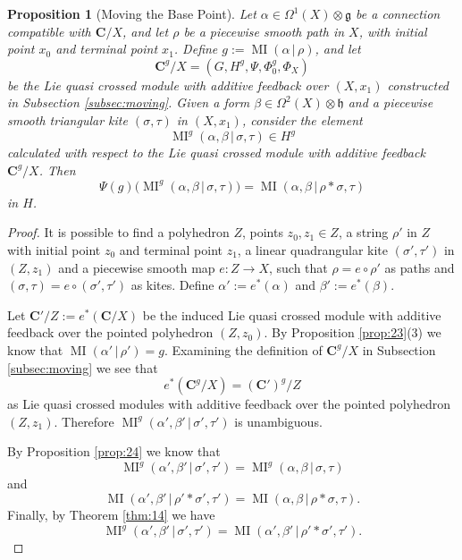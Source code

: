 \documentclass[10pt, a4paper]{amsart}
\newtheorem{prop}[equation]{Proposition}
\theoremstyle{definition}
\numberwithin{equation}{section}
\newcommand{\opn}{\operatorname}
\newcommand{\mfrak}[1]{\mathfrak{#1}}
\newcommand{\mbf}[1]{\mathbf{#1}}
\newcommand{\tup}[1]{\textup{#1}}
\renewcommand{\vert}{\, | \,}
\newcommand{\g}{\mfrak{g}}
\newcommand{\h}{\mfrak{h}}
\begin{document}
\begin{prop}[Moving the Base Point] \label{prop:25}
Let $\alpha \in \Omega^1(X) \otimes \g$
be a connection compatible with $\mbf{C} / X$, and let
$\rho$ be a piecewise smooth path in $X$, with initial point $x_0$ and terminal
point $x_1$. Define
$g := \opn{MI}(\alpha \vert \rho)$, 
and let
\[ \mbf{C}^g / X = (G, H^g, \Psi, \Phi_0^g, \Phi_X) \]
be the Lie quasi crossed module with additive feedback over $(X, x_1)$
constructed in Subsection \tup{\ref{subsec:moving}}.
Given a form 
$\beta \in \Omega^2(X) \otimes \h$ and a piecewise smooth triangular kite
$(\sigma, \tau)$ in  $(X, x_1)$, consider the element
\[ \opn{MI}^g(\alpha, \beta \vert \sigma, \tau) \in H^g  \]
calculated with respect to the Lie quasi crossed module
with additive feedback $\mbf{C}^g / X$. Then 
\[ \Psi(g) \bigl( \opn{MI}^g(\alpha, \beta \vert \sigma, \tau) \bigr)  =
\opn{MI}(\alpha, \beta \vert \rho * \sigma, \tau)  \]
in $H$. 
\end{prop}

\begin{proof}
It is possible to find a polyhedron $Z$, points  $z_0, z_1 \in Z$, a string
$\rho'$ in $Z$ with initial point $z_0$ and terminal point $z_1$, 
a linear quadrangular kite $(\sigma', \tau')$ in 
$(Z, z_1)$ and a piecewise smooth map 
$e : Z \to X$, such that $\rho = e \circ \rho'$ as paths and 
$(\sigma, \tau) = e \circ (\sigma', \tau')$ as kites. 
Define
$\alpha' := e^*(\alpha)$ and $\beta' := e^*(\beta)$.

Let $\mbf{C}' / Z := e^*(\mbf{C} / X)$ be the induced 
Lie quasi crossed module with additive feedback over the pointed polyhedron
$(Z, z_0)$. By Proposition \ref{prop:23}(3) we know that 
$\opn{MI}(\alpha' \vert \rho') = g$. Examining the definition of
$\mbf{C}^g / X$ in Subsection \ref{subsec:moving} we see that
\[ e^*(\mbf{C}^g / X) = (\mbf{C}')^g / Z \]
as Lie quasi crossed modules with additive feedback over the pointed polyhedron
$(Z, z_1)$. Therefore 
$\opn{MI}^g(\alpha', \beta' \vert \sigma', \tau')$
is unambiguous. 

By Proposition \ref{prop:24} we know that
\[ \opn{MI}^g(\alpha', \beta' \vert \sigma', \tau') = 
\opn{MI}^g(\alpha, \beta \vert \sigma, \tau ) \]
and
\[ \opn{MI}(\alpha', \beta' \vert \rho' * \sigma', \tau') = 
\opn{MI}(\alpha, \beta \vert  \rho * \sigma, \tau ) . \]
Finally, by Theorem \ref{thm:14} we have
\[ \opn{MI}^g(\alpha', \beta' \vert \sigma', \tau') = 
\opn{MI}(\alpha', \beta' \vert \rho' * \sigma', \tau') . \]
\end{proof}
\end{document}
